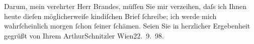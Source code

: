 \pstart
           Darum, mein verehrter Herr Brandes, müſſen Sie mir verzeihen, daſs ich Ihnen heute
               dieſen möglicherweiſe kindiſchen Brief ſchreibe; ich werde mich wahrſcheinlich morgen
               ſchon ſeiner ſchämen.\pend
           \pstart Seien Sie in herzlicher Ergebenheit gegrüßt von Ihrem
                  \spacefill\mbox{ArthurSchnitzler}\pend{}
\pstart
           Wien22. 9. 98.\pend
           \endnumbering{}  
      